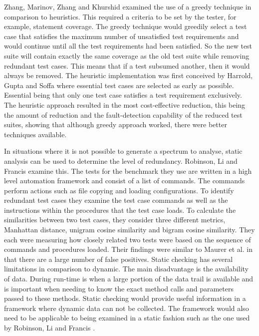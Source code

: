 \documentclass[11pt
              , a4paper
              , twoside
              , openright
              ]{report}
\begin{document}
Zhang, Marinov, Zhang and Khurshid \cite{zhang2011empirical} examined the use of a greedy technique in comparison to heuristics. This required a criteria to be set by the tester, for example, statement coverage. The greedy technique would greedily select a test case that satisfies the maximum number of unsatisfied test requirements and would continue until all the test requirements had been satisfied. So the new test suite will contain exactly the same coverage as the old test suite while removing redundant test cases. This means that if a test subsumed another, then it would always be removed. The heuristic implementation was first conceived by Harrold, Gupta and Soffa \cite{harrold1993methodology} where essential test cases are selected as early as possible. Essential being that only one test case satisfies a test requirement exclusively. The heuristic approach resulted in the most cost-effective reduction, this being the amount of reduction and the fault-detection capability of the reduced test suites, showing that although greedy approach worked, there were better techniques available.

In situations where it is not possible to generate a spectrum to analyse, static analysis can be used to determine the level of redundancy. Robinson, Li and Francis \cite{li2008static} examine this. The tests for the benchmark they use are written in a high level automation framework and consist of a list of commands. The commands perform actions such as file copying and loading configurations. To identify redundant test cases they examine the test case commands as well as the instructions within the procedures that the test case loads. To calculate the similarities between two test cases, they consider three different metrics, Manhattan distance, unigram cosine similarity and bigram cosine similarity. They each were measuring how closely related two tests were based on the sequence of commands and procedures loaded. Their findings were similar to Maurer et al. \cite{koochakzadeh2009test} in that there are a large number of false positives. Static checking has several limitations in comparison to dynamic. The main disadvantage is the availability of data. During run-time is when a large portion of the data trail is available and is important when needing to know the exact method calls and parameters passed to these methods. Static checking would provide useful information in a framework where dynamic data can not be collected. The framework would also need to be applicable to being examined in a static fashion such as the one used by Robinson, Li and Francis \cite{li2008static}.
\end{document}
